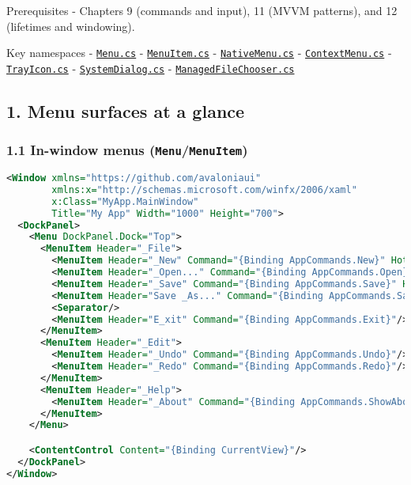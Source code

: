 Prerequisites - Chapters 9 (commands and input), 11 (MVVM patterns), and
12 (lifetimes and windowing).

Key namespaces -
\href{https://github.com/AvaloniaUI/Avalonia/blob/master/src/Avalonia.Controls/Menu.cs}{\passthrough{\lstinline!Menu.cs!}}
-
\href{https://github.com/AvaloniaUI/Avalonia/blob/master/src/Avalonia.Controls/MenuItem.cs}{\passthrough{\lstinline!MenuItem.cs!}}
-
\href{https://github.com/AvaloniaUI/Avalonia/blob/master/src/Avalonia.Controls/NativeMenu.cs}{\passthrough{\lstinline!NativeMenu.cs!}}
-
\href{https://github.com/AvaloniaUI/Avalonia/blob/master/src/Avalonia.Controls/ContextMenu.cs}{\passthrough{\lstinline!ContextMenu.cs!}}
-
\href{https://github.com/AvaloniaUI/Avalonia/blob/master/src/Avalonia.Controls/TrayIcon.cs}{\passthrough{\lstinline!TrayIcon.cs!}}
-
\href{https://github.com/AvaloniaUI/Avalonia/blob/master/src/Avalonia.Controls/SystemDialog.cs}{\passthrough{\lstinline!SystemDialog.cs!}}
-
\href{https://github.com/AvaloniaUI/Avalonia/blob/master/src/Avalonia.Dialogs/ManagedFileChooser.cs}{\passthrough{\lstinline!ManagedFileChooser.cs!}}

\subsection{1. Menu surfaces at a
glance}\label{menu-surfaces-at-a-glance}

\subsubsection{\texorpdfstring{1.1 In-window menus
(\texttt{Menu}/\texttt{MenuItem})}{1.1 In-window menus (Menu/MenuItem)}}\label{in-window-menus-menumenuitem}

\begin{lstlisting}[language=XML]
<Window xmlns="https://github.com/avaloniaui"
        xmlns:x="http://schemas.microsoft.com/winfx/2006/xaml"
        x:Class="MyApp.MainWindow"
        Title="My App" Width="1000" Height="700">
  <DockPanel>
    <Menu DockPanel.Dock="Top">
      <MenuItem Header="_File">
        <MenuItem Header="_New" Command="{Binding AppCommands.New}" HotKey="Ctrl+N"/>
        <MenuItem Header="_Open..." Command="{Binding AppCommands.Open}" HotKey="Ctrl+O"/>
        <MenuItem Header="_Save" Command="{Binding AppCommands.Save}" HotKey="Ctrl+S"/>
        <MenuItem Header="Save _As..." Command="{Binding AppCommands.SaveAs}"/>
        <Separator/>
        <MenuItem Header="E_xit" Command="{Binding AppCommands.Exit}"/>
      </MenuItem>
      <MenuItem Header="_Edit">
        <MenuItem Header="_Undo" Command="{Binding AppCommands.Undo}"/>
        <MenuItem Header="_Redo" Command="{Binding AppCommands.Redo}"/>
      </MenuItem>
      <MenuItem Header="_Help">
        <MenuItem Header="_About" Command="{Binding AppCommands.ShowAbout}"/>
      </MenuItem>
    </Menu>

    <ContentControl Content="{Binding CurrentView}"/>
  </DockPanel>
</Window>
\end{lstlisting}

